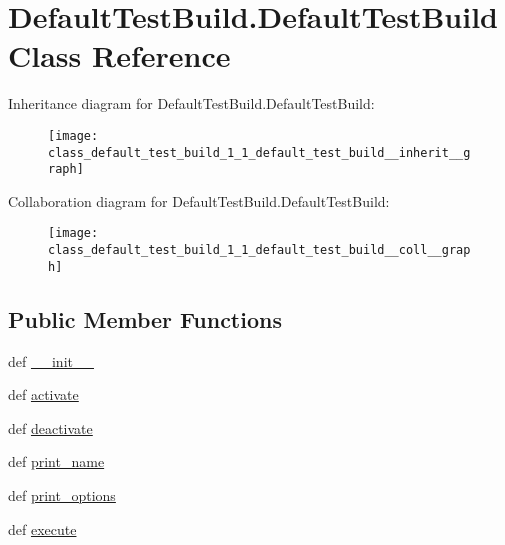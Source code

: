 \hypertarget{class_default_test_build_1_1_default_test_build}{\section{Default\-Test\-Build.\-Default\-Test\-Build Class Reference}
\label{class_default_test_build_1_1_default_test_build}
}


Inheritance diagram for Default\-Test\-Build.\-Default\-Test\-Build\-:
\nopagebreak
\begin{figure}[H]
\begin{center}
\leavevmode
\texttt{[image: class\_default\_test\_build\_1\_1\_default\_test\_build\_\_inherit\_\_graph]}
\end{center}
\end{figure}


Collaboration diagram for Default\-Test\-Build.\-Default\-Test\-Build\-:
\nopagebreak
\begin{figure}[H]
\begin{center}
\leavevmode
\texttt{[image: class\_default\_test\_build\_1\_1\_default\_test\_build\_\_coll\_\_graph]}
\end{center}
\end{figure}
\subsection*{Public Member Functions}
\begin{DoxyCompactItemize}
\item 
def \hyperlink{class_default_test_build_1_1_default_test_build_a08729e27591861a8c9b61a6b2618ec2f}{\-\_\-\-\_\-init\-\_\-\-\_\-}
\item 
def \hyperlink{class_default_test_build_1_1_default_test_build_a88b530e5d66e5dc310f77087d8744345}{activate}
\item 
def \hyperlink{class_default_test_build_1_1_default_test_build_a3a1fbc64d9a4750d7ecf722fb6bcd1ce}{deactivate}
\item 
def \hyperlink{class_default_test_build_1_1_default_test_build_a391c37a5d652ad857c57ae07b66b0d7e}{print\-\_\-name}
\item 
def \hyperlink{class_default_test_build_1_1_default_test_build_a38238916f0726d3a8e2b352ddc74f424}{print\-\_\-options}
\item 
def \hyperlink{class_default_test_build_1_1_default_test_build_a17ce5f679320871748b5aa3ea3491c28}{execute}
\end{DoxyCompactItemize}
